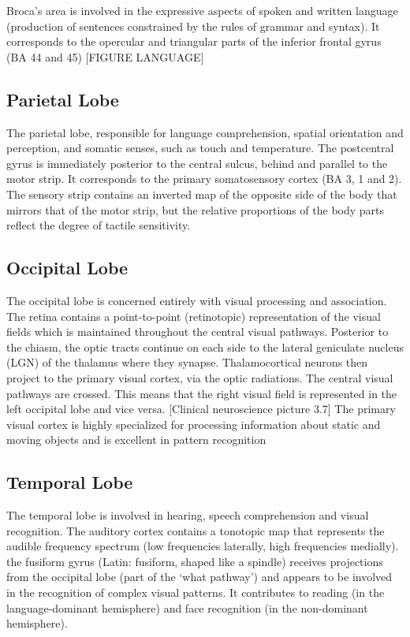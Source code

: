 Broca’s area is involved in the expressive aspects of spoken and written language (production of sentences constrained by the rules of grammar and syntax). 
It corresponds to the opercular and triangular parts of the inferior frontal gyrus (BA 44 and 45) [FIGURE LANGUAGE]


\subsection{Parietal Lobe}
The parietal lobe, responsible for language comprehension, spatial orientation and perception, and somatic senses, such as touch and temperature.
The postcentral gyrus is immediately posterior to the central sulcus, behind and parallel to the motor strip.
It corresponds to the primary somatosensory cortex (BA 3, 1 and 2).
The sensory strip contains an inverted map of the opposite side of the body that mirrors that of the motor strip, but the relative proportions of the body parts reflect the degree of tactile sensitivity.

\subsection{Occipital Lobe}
The occipital lobe is concerned entirely with visual processing and association.
The retina contains a point-to-point (retinotopic) representation of the visual fields which is maintained throughout the central visual pathways.
Posterior to the chiasm, the optic tracts continue on each side to the lateral geniculate nucleus (LGN) of the thalamus where they synapse.
Thalamocortical neurons then project to the primary visual cortex, via the optic radiations.
The central visual pathways are crossed. This means that the right visual field is represented in the left occipital lobe and vice versa.
[Clinical neuroscience picture 3.7]
The primary visual cortex is highly specialized for processing information about static and moving objects and is excellent in pattern recognition

\subsection{Temporal Lobe}
The temporal lobe is involved in hearing, speech comprehension and visual recognition.
The auditory cortex contains a tonotopic map that represents the audible frequency spectrum (low frequencies laterally, high frequencies medially).
the fusiform gyrus (Latin: fusiform, shaped like a spindle) receives projections from the occipital lobe (part of the ‘what pathway’) and appears to be involved in the recognition of complex visual patterns.
It contributes to reading (in the language-dominant hemisphere) and face recognition (in the non-dominant hemisphere).

